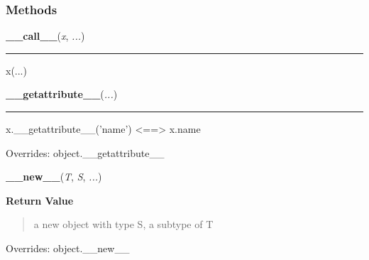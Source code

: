 
  \subsubsection{Methods}

    \label{operator:itemgetter:__call__}

    \vspace{0.5ex}

\hspace{.8\funcindent}\begin{boxedminipage}{\funcwidth}

    \raggedright \textbf{\_\_call\_\_}(\textit{x}, \textit{...})

    \vspace{-1.5ex}

    \rule{\textwidth}{0.5\fboxrule}
\setlength{\parskip}{2ex}
    x(...)

\setlength{\parskip}{1ex}
    \end{boxedminipage}

    \vspace{0.5ex}

\hspace{.8\funcindent}\begin{boxedminipage}{\funcwidth}

    \raggedright \textbf{\_\_getattribute\_\_}(\textit{...})

    \vspace{-1.5ex}

    \rule{\textwidth}{0.5\fboxrule}
\setlength{\parskip}{2ex}
    x.\_\_getattribute\_\_('name') {\textless}=={\textgreater} x.name

\setlength{\parskip}{1ex}
      Overrides: object.\_\_getattribute\_\_

    \end{boxedminipage}

    \vspace{0.5ex}

\hspace{.8\funcindent}\begin{boxedminipage}{\funcwidth}

    \raggedright \textbf{\_\_new\_\_}(\textit{T}, \textit{S}, \textit{...})

\setlength{\parskip}{2ex}
\setlength{\parskip}{1ex}
      \textbf{Return Value}
    \vspace{-1ex}

      \begin{quote}
      a new object with type S, a subtype of T

      \end{quote}

      Overrides: object.\_\_new\_\_

    \end{boxedminipage}


